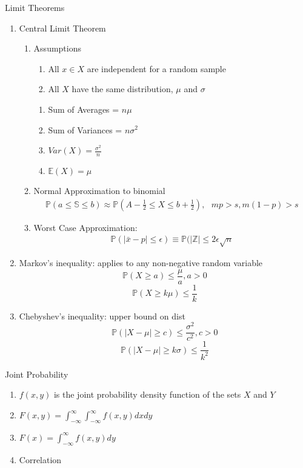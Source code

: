 \documentclass[12pt]{article}
\newcommand{\abs}[1]{\left| #1 \right|} %
\renewcommand{\=}[1]{\stackrel{#1}{=}} %
\theoremstyle{definition}
\theoremstyle{remark}
\begin{document}
Limit Theorems
\begin{enumerate}
\item Central Limit Theorem
  \begin{enumerate}
  \item Assumptions
    \begin{enumerate}
    \item All $x \in X$ are independent for a random sample
    \item All $X$ have the same distribution, $\mu$ and $\sigma$
    \end{enumerate}
    \begin{enumerate}
    \item Sum of Averages = $n\mu$
    \item Sum of Variances = $n\sigma^2$
    \item $Var(X) = \frac{\sigma^2}{n}$
    \item $\mathbb{E}(X) = \mu$
    \end{enumerate}
  \item Normal Approximation to binomial
        \begin{align*}
      \mathbb{P}(a \leq \mathbb{S} \leq b) \approx
      \mathbb{P}(A-\frac{1}{2} \leq X \leq b + \frac{1}{2}),\textrm{ } mp > s, m(1-p)>s
    \end{align*}
  \item Worst Case Approximation:
    \begin{align*}
      \mathbb{P}(\abs{\bar{x}-p} \leq \epsilon) \equiv
      \mathbb{P}(\abs{\mathbb{Z}} \leq 2\epsilon\sqrt{n}
    \end{align*}
  \end{enumerate}
\item Markov's inequality: applies to any non-negative random variable
  \begin{equation}
    \mathbb{P}(X \geq a) \leq \frac{\mu}{a} , a >0
  \end{equation}
  \begin{equation}
    \mathbb{P}(X \geq k\mu) \leq \frac{1}{k}
  \end{equation}
\item Chebyshev's inequality: upper bound on dist
  \begin{equation}
    \mathbb{P}(\abs{X-\mu} \geq c) \leq \frac{\sigma^2}{c^2}, c>0
  \end{equation}
  \begin{equation}
    \mathbb{P}(\abs{X-\mu} \geq k\sigma) \leq \frac{1}{k^2}
  \end{equation}
\end{enumerate}
Joint Probability
\begin{enumerate}
\item $f(x,y)$ is the joint probability density function of the sets
  $X$ and $Y$
\item $F(x,y) = \int_{-\infty}^{\infty}\int_{-\infty}^{\infty}f(x,y)dxdy$
\item $F(x)=  \int_{-\infty}^{\infty}f(x,y)dy$
\item Correlation
\end{enumerate}
\end{document}
